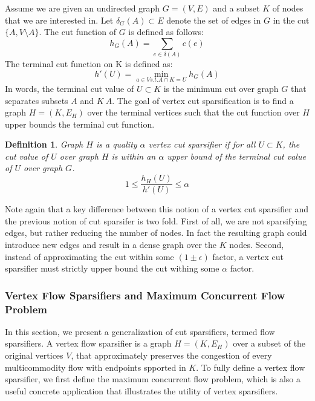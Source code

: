 \documentclass[12pt]{article}
\newtheorem{definition}{Definition}
\begin{document}
    Assume we are given an undirected graph $G = (V,E)$ and a subset $K$ of nodes that we are interested in. Let $\delta_G(A) \subset E$ denote the set of edges in $G$ in the cut $\{A, V \setminus A \}$. The cut function of $G$ is defined as follows:
    \[h_G(A) = \sum_{e \in \delta(A)} c(e)\]
    The terminal cut function on K is defined as:
    \[h'(U) = \min_{a \in V s.t. A \cap K = U} h_G(A)\]
    In words, the terminal cut value of $U \subset K$ is the minimum cut over graph $G$ that separates subsets $A$ and $K \ A$. The goal of vertex cut sparsification is to find a graph $H = (K, E_H)$ over the terminal vertices such that the cut function over $H$ upper bounds the terminal cut function.
    \begin{definition}
    Graph $H$ is a quality $\alpha$ vertex cut sparsifier if for all $U \subset K$, the cut value of $U$ over graph $H$ is within an $\alpha$ upper bound of the terminal cut value of $U$ over graph $G$.
    \[1 \leq \frac{h_H(U)}{h'(U)} \leq \alpha\]
    \end{definition}
    Note again that a key difference between this notion of a vertex cut sparsifier and the previous notion of cut sparsifer is two fold. First of all, we are not sparsifying edges, but rather reducing the number of nodes. In fact the resulting graph could introduce new edges and result in a dense graph over the $K$ nodes. Second, instead of approximating the cut within some $(1 \pm \epsilon)$ factor, a vertex cut sparsifier must strictly upper bound the cut withing some $\alpha$ factor.
    
    \subsubsection{Vertex Flow Sparsifiers and Maximum Concurrent Flow Problem}
    

		In this section, we present a generalization of cut sparsifiers, termed flow sparsifiers. A vertex flow sparsifier is a graph $H = (K, E_H)$ over a subset of the original vertices $V$, that approximately preserves the congestion of every multicommodity flow with endpoints spported in $K$. To fully define a vertex flow sparsifier, we first define the maximum concurrent flow problem, which is also a useful concrete application that illustrates the utility of vertex sparsifiers.
		
\end{document}
